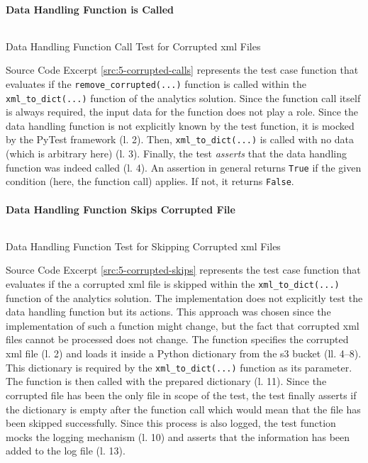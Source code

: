 \paragraph{Data Handling Function is Called}
\begin{listing}[h!]
	\inputminted{python}{main-matter/src/5-corrupted-calls.py}
	\caption{Data Handling Function Call Test for Corrupted \ac{xml} Files}
	\label{src:5-corrupted-calls}
\end{listing}
Source Code Excerpt \ref{src:5-corrupted-calls} represents the test case function that evaluates if the \texttt{remove\_corrupted(...)} function is called within the \texttt{xml\_to\_dict(...)} function of the analytics solution. Since the function call itself is always required, the input data for the function does not play a role. Since the data handling function is not explicitly known by the test function, it is mocked by the PyTest framework (l. 2). Then, \texttt{xml\_to\_dict(...)} is called with no data (which is arbitrary here) (l. 3). Finally, the test \textit{asserts} that the data handling function was indeed called (l. 4). An assertion in general returns \texttt{True} if the given condition (here, the function call) applies. If not, it returns \texttt{False}. 

\paragraph{Data Handling Function Skips Corrupted File}
\begin{listing}[h!]
	\inputminted{python}{main-matter/src/5-corrupted-skips.py}
	\caption{Data Handling Function Test for Skipping Corrupted \ac{xml} Files}
	\label{src:5-corrupted-skips}
\end{listing}
Source Code Excerpt \ref{src:5-corrupted-skips} represents the test case function that evaluates if the a corrupted \ac{xml} file is skipped within the \texttt{xml\_to\_dict(...)} function of the analytics solution. The implementation does not explicitly test the data handling function but its actions. This approach was chosen since the implementation of such a function might change, but the fact that corrupted \ac{xml} files cannot be processed does not change. The function specifies the corrupted \ac{xml} file (l. 2) and loads it inside a Python dictionary from the \ac{s3} bucket (ll. 4--8). This dictionary is required by the \texttt{xml\_to\_dict(...)} function as its parameter. The function is then called with the prepared dictionary (l. 11). Since the corrupted file has been the only file in scope of the test, the test finally asserts if the dictionary is empty after the function call which would mean that the file has been skipped successfully. Since this process is also logged, the test function mocks the logging mechanism (l. 10) and asserts that the information has been added to the log file (l. 13). 
\newpage
